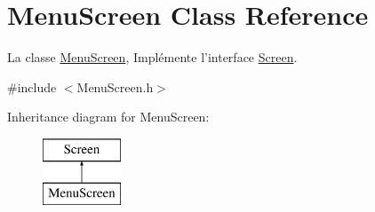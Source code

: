 \hypertarget{classMenuScreen}{\section{Menu\-Screen Class Reference}
\label{classMenuScreen}
}


La classe \hyperlink{classMenuScreen}{Menu\-Screen}, Implémente l'interface \hyperlink{classScreen}{Screen}.  




{\ttfamily \#include $<$Menu\-Screen.\-h$>$}

Inheritance diagram for Menu\-Screen\-:\begin{figure}[H]
\begin{center}
\leavevmode
\includegraphics[height=2.000000cm]{classMenuScreen}
\end{center}
\end{figure}
